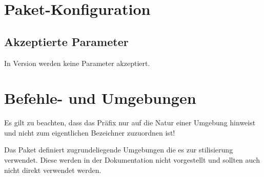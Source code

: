 \documentclass{sopra-base}
\begin{document}
\section{Paket-Konfiguration}
    \subsection{Akzeptierte Parameter}
    In Version \thesosversion{} werden keine Parameter akzeptiert.

%
%
%
%

\section{Befehle- und Umgebungen}

Es gilt zu beachten, dass das Präfix  nur auf die Natur einer Umgebung hinweist und nicht zum eigentlichen Bezeichner zuzuordnen ist!\par{}
Das Paket definiert zugrundeliegende Umgebungen die es zur stilisierung verwendet.
Diese werden in der Dokumentation nicht vorgestellt und sollten auch nicht direkt
verwendet werden.
\end{document}
